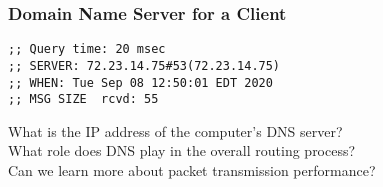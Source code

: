 \documentclass[14pt,aspectratio=169]{beamer}
\begin{document}
%
\begin{frame}[fragile]
  \frametitle{Domain Name Server for a Client}
  \normalsize
  \hspace*{.15in}
  \begin{minipage}{6in}
    \vspace*{.25in}
    \begin{verbatim}
;; Query time: 20 msec
;; SERVER: 72.23.14.75#53(72.23.14.75)
;; WHEN: Tue Sep 08 12:50:01 EDT 2020
;; MSG SIZE  rcvd: 55
    \end{verbatim}
  \end{minipage}
  \vspace*{.25in}
  \begin{center}
    \normalsize \noindent What is the IP address of the computer's DNS server? \\
    \normalsize \noindent What role does DNS play in the overall routing process? \\
    \normalsize \noindent Can we learn more about packet transmission performance? \\
  \end{center}
\end{frame}
\end{document}
